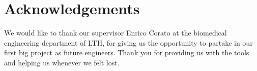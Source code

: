 \documentclass[twoside,twocolumn,9pt,a4paper]{IEEEtran}
\begin{document}

\section{Acknowledgements}

We would like to thank our supervisor Enrico Corato at the biomedical engineering department of LTH, for giving us the opportunity to partake in our first big project as future engineers. Thank you for providing us with the tools and helping us whenever we felt lost.
 




\end{document}
